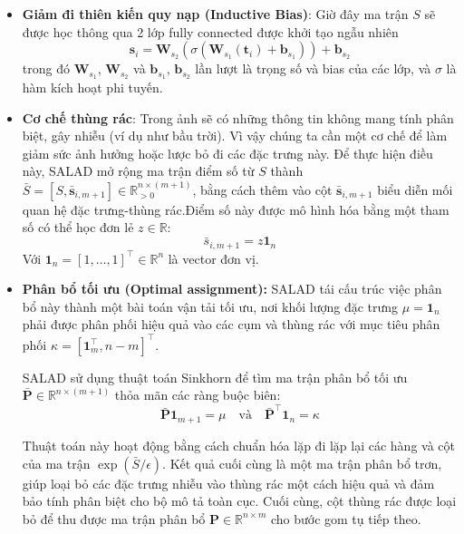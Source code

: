 \documentclass[12pt,a4paper]{article}
\begin{document}
    \begin{itemize}
    \item \textbf{Giảm đi thiên kiến quy nạp (Inductive Bias)}: Giờ đây ma trận $S$ sẽ được học thông qua 2 lớp fully connected được khởi tạo ngẫu nhiên 
    \begin{equation}
    \mathbf{s}_i = \mathbf{W}_{s_2}(\sigma (\mathbf{W}_{s_1}(\mathbf{t}_{i}) + \mathbf{b}_{s_1})) + \mathbf{b}_{s_2}
    \label{eq:score_computation}
    \end{equation}
    trong đó $\mathbf{W}_{s_1}$, $\mathbf{W}_{s_2}$ và $\mathbf{b}_{s_1}$, $\mathbf{b}_{s_2}$ lần lượt là trọng số và bias của các lớp, và $\sigma$ là hàm kích hoạt phi tuyến.
    \item \textbf{Cơ chế thùng rác}: Trong ảnh sẽ có những thông tin không mang tính phân biệt, gây nhiễu (ví dụ như bầu trời). Vì vậy chúng ta cần một cơ chế để làm giảm sức ảnh hưởng hoặc lược bỏ đi các đặc trưng này. Để thực hiện điều này, SALAD mở rộng ma trận điểm số từ $S$ thành $\bar{S} = [S, \bar{\mathbf{s}}_{i,m+1}] \in \mathbb{R}^{n \times (m+1)}_{>0}$, bằng cách thêm vào cột $\bar{\mathbf{s}}_{i,m+1}$ biểu diễn mối quan hệ đặc trưng-thùng rác.Điểm số này được mô hình hóa bằng một tham số có thể học đơn lẻ $z \in \mathbb{R}$: 
    \begin{equation}
    \bar{s}_{i,m+1} = z\mathbf{1}_n
    \end{equation}
    Với $\mathbf{1}_n = [1, \dots, 1]^\top \in \mathbb{R}^n$ là vector đơn vị.
    \item \textbf{Phân bổ tối ưu (Optimal assignment):} SALAD tái cấu trúc việc phân bổ này thành một bài toán vận tải tối ưu, nơi khối lượng đặc trưng $\mu = \mathbf{1}_n$ phải được phân phối hiệu quả vào các cụm và thùng rác với mục tiêu phân phối $\kappa = [\mathbf{1}_m^\top, n - m]^\top$.
    
    SALAD sử dụng thuật toán Sinkhorn để tìm ma trận phân bổ tối ưu $\bar{\mathbf{P}} \in \mathbb{R}^{n \times (m+1)}$ thỏa mãn các ràng buộc biên:
    \begin{equation}
    \bar{\mathbf{P}}\mathbf{1}_{m+1} = \mu \quad \text{và} \quad \bar{\mathbf{P}}^\top\mathbf{1}_n = \kappa
    \label{eq:sinkhorn_constraints}
    \end{equation}
    
    Thuật toán này hoạt động bằng cách chuẩn hóa lặp đi lặp lại các hàng và cột của ma trận $\exp(\bar{S}/\epsilon)$. Kết quả cuối cùng là một ma trận phân bổ trơn, giúp loại bỏ các đặc trưng nhiễu vào thùng rác một cách hiệu quả và đảm bảo tính phân biệt cho bộ mô tả toàn cục. Cuối cùng, cột thùng rác được loại bỏ để thu được ma trận phân bổ $\mathbf{P} \in \mathbb{R}^{n \times m}$ cho bước gom tụ tiếp theo.
    \end{itemize}
\end{document}
